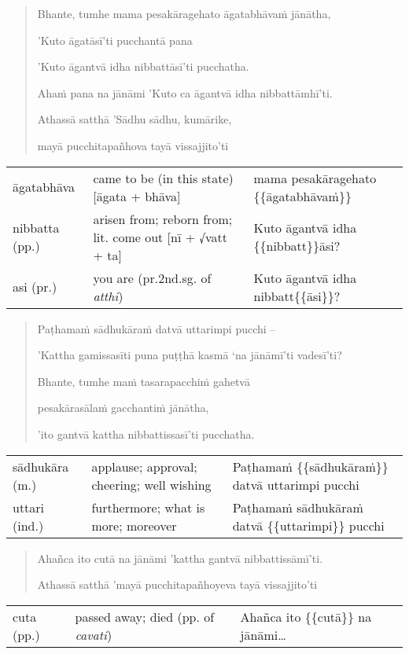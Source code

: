 \documentclass[11pt,oneside]{memoir}
\begin{document}
\clearpage

\begin{quote}
Bhante, tumhe mama pesakāragehato āgatabhāvaṁ jānātha,

'Kuto āgatāsī'ti pucchantā pana

'Kuto āgantvā idha nibbattāsī'ti pucchatha.

Ahaṁ pana na jānāmi 'Kuto ca āgantvā idha nibbattāmhī'ti.

Athassā satthā 'Sādhu sādhu, kumārike,

mayā pucchitapañhova tayā vissajjito'ti
\end{quote}

\begin{longtable}{L{\colOne} L{\colTwo} H}
āgatabhāva & came to be (in this state) [āgata + bhāva] & mama pesakāragehato \{\{āgatabhāvaṁ\}\}\\[0pt]
nibbatta (pp.) & arisen from; reborn from; lit. come out [nī + √vatt + ta] & Kuto āgantvā idha \{\{nibbatt\}\}āsi?\\[0pt]
asi (pr.) & you are (pr.2nd.sg. of \emph{atthi}) & Kuto āgantvā idha nibbatt\{\{āsi\}\}?\\[0pt]
\end{longtable}


\clearpage

\begin{quote}
Paṭhamaṁ sādhukāraṁ datvā uttarimpi pucchi --

'Kattha gamissasīti puna puṭṭhā kasmā `na jānāmī'ti vadesī'ti?

Bhante, tumhe maṁ tasarapacchiṁ gahetvā

pesakārasālaṁ gacchantiṁ jānātha,

'ito gantvā kattha nibbattissasī'ti pucchatha.
\end{quote}

\begin{longtable}{L{\colOne} L{\colTwo} H}
sādhukāra (m.) & applause; approval; cheering; well wishing & Paṭhamaṁ \{\{sādhukāraṁ\}\} datvā uttarimpi pucchi\\[0pt]
uttari (ind.) & furthermore; what is more; moreover & Paṭhamaṁ sādhukāraṁ datvā \{\{uttarimpi\}\} pucchi\\[0pt]
\end{longtable}


\clearpage

\begin{quote}
Ahañca ito cutā na jānāmi 'kattha gantvā nibbattissāmī'ti.

Athassā satthā 'mayā pucchitapañhoyeva tayā vissajjito'ti
\end{quote}

\begin{longtable}{L{\colOne} L{\colTwo} H}
cuta (pp.) & passed away; died (pp. of \emph{cavati}) & Ahañca ito \{\{cutā\}\} na jānāmi\ldots{}\\[0pt]
\end{longtable}

\end{document}
